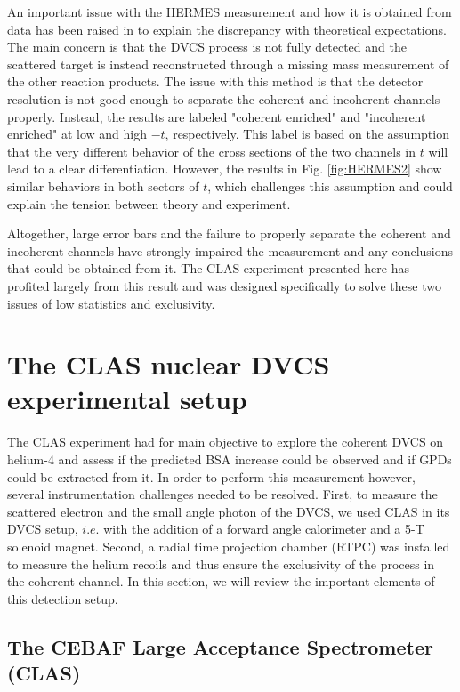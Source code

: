 \documentclass{article}
\begin{document}
An important issue with the HERMES measurement and how it is obtained from data has been raised in
\cite{Guzey:2003jh} to explain the discrepancy with theoretical expectations.
The main concern is that the DVCS process is not fully detected and the scattered target
is instead reconstructed through a missing mass measurement of the other reaction products. The 
issue with this method is that the detector resolution is not good enough to separate the 
coherent and incoherent channels properly. 
Instead, the results are labeled "coherent enriched" and "incoherent enriched" at low and high 
$-t$, respectively. This label is based on the assumption that the very different behavior of the
cross sections of the two channels in $t$ will lead to a clear differentiation. However, the
results in Fig. \ref{fig:HERMES2} show similar behaviors in both sectors of $t$, which  
challenges this assumption and could explain the tension between theory and experiment. 

Altogether, large error bars and the failure to properly separate the coherent and 
incoherent channels have strongly impaired the measurement and any conclusions that could be
obtained from it. The CLAS experiment presented here has profited largely from this
result and was designed specifically to solve these two issues of low statistics and exclusivity.

\section{The CLAS nuclear DVCS experimental setup}

The CLAS experiment had for main objective to explore the coherent DVCS on helium-4 and assess if
the predicted BSA increase could be observed and if GPDs could be extracted from it. In order to
perform this measurement however, several instrumentation challenges needed to be resolved. First, to
measure the scattered electron and the small angle photon of the DVCS, we used CLAS in its 
DVCS setup, $i.e.$ with the addition of a forward angle calorimeter and a 5-T solenoid magnet. Second, a
radial time projection chamber (RTPC) was installed to measure the
helium recoils and thus ensure the exclusivity of the process in the coherent channel. In this section, we 
will review the important elements of this detection setup. 

\subsection{The CEBAF Large Acceptance Spectrometer (CLAS)}
\end{document}
